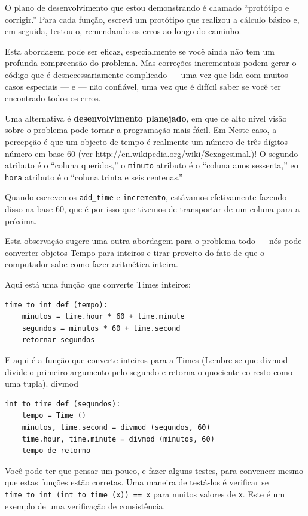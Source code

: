 \documentclass[10pt]{book}
\begin{document}
\begin{exercise}
\begin{v erbatim}
{O plano de desenvolvimento que estou demonstrando é chamado ``protótipo e
corrigir.'' Para cada função, escrevi um protótipo que realizou a
cálculo básico e, em seguida, testou-o, remendando os erros ao longo do
caminho.

Esta abordagem pode ser eficaz, especialmente se você ainda não tem um
profunda compreensão do problema. Mas correções incrementais podem
gerar o código que é desnecessariamente complicado --- uma vez que lida com
muitos casos especiais --- e --- não confiável, uma vez que é difícil saber se você
ter encontrado todos os erros.

Uma alternativa é {\bf desenvolvimento planejado}, em que de alto nível
visão sobre o problema pode tornar a programação mais fácil. Em
Neste caso, a percepção é que um objecto de tempo é realmente um número de três dígitos
número em base 60 (ver \url{http://en.wikipedia.org/wiki/Sexagesimal}.)! O
{\tt} segundo atributo é o ``coluna queridos,'' o {\tt minuto}
atributo é o ``coluna anos sessenta,'' eo {\tt hora} atributo é
o ``coluna trinta e seis centenas.''

Quando escrevemos \verb "add_time" e {\tt incremento}, estávamos efetivamente
fazendo disso na base 60, que é por isso que tivemos de transportar de um
coluna para a próxima.

Esta observação sugere uma outra abordagem para o problema todo --- nós
pode converter objetos Tempo para inteiros e tirar proveito do fato de
que o computador sabe como fazer aritmética inteira.  

Aqui está uma função que converte Times inteiros:

\begin{verbatim}
time_to_int def (tempo):
    minutos = time.hour * 60 + time.minute
    segundos = minutos * 60 + time.second
    retornar segundos
\end{verbatim}
%
E aqui é a função que converte inteiros para a Times
(Lembre-se que {divmod \tt} divide o primeiro argumento pelo segundo
e retorna o quociente eo resto como uma tupla).
\index{} divmod

\begin{verbatim}
int_to_time def (segundos):
    tempo = Time ()
    minutos, time.second = divmod (segundos, 60)
    time.hour, time.minute = divmod (minutos, 60)
    tempo de retorno
\end{verbatim}
%
Você pode ter que pensar um pouco, e fazer alguns testes, para convencer
mesmo que estas funções estão corretas. Uma maneira de testá-los é
verificar se \verb "time_to_int (int_to_time (x)) == x" para muitos valores de
{\tt x}. Este é um exemplo de uma verificação de consistência.

}
\end{v erbatim}
\end{exercise}
\end{document}
